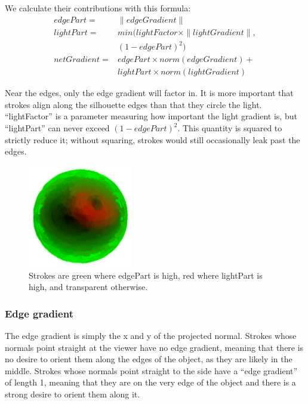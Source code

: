 \documentclass[conference]{acmsiggraph}
\begin{document}
We calculate their contributions with this formula:
\begin{align*}
  edgePart = &\| edgeGradient \| \\
  lightPart = &min(lightFactor \times \| lightGradient \| , \\
              &(1 - edgePart)^2) \\
  netGradient = &edgePart \times norm(edgeGradient) +\\
                &lightPart \times norm(lightGradient)
\end{align*}

Near the edges, only the edge gradient will factor in. It is more important
that strokes align along the silhouette edges than that they circle the light.
``lightFactor'' is a parameter measuring how important the light gradient is,
but ``lightPart'' can never exceed $(1 - edgePart)^2$. This quantity is squared
to strictly reduce it; without squaring, strokes would still occasionally leak
past the edges.


\begin{figure}
  \centering
  \includegraphics[width=1.8in]{images/betterLightPartCamPartShaded}
  \caption{Strokes are green where edgePart is high, red where lightPart is
           high, and transparent otherwise.}
\end{figure}

\subsubsection{Edge gradient}

The edge gradient is simply the x and y of the projected normal. Strokes whose
normals point straight at the viewer have no edge gradient, meaning that there
is no desire to orient them along the edges of the object, as they are likely
in the middle. Strokes whose normals point straight to the side have a
``edge gradient'' of length 1, meaning that they are on the very edge of the
object and there is a strong desire to orient them along it.
\end{document}
